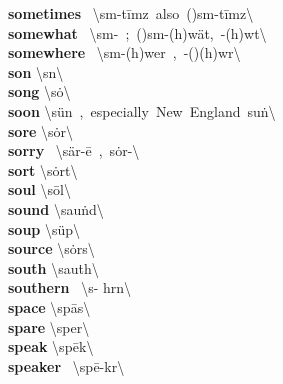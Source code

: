 \documentclass[10pt,a4paper]{article}
\begin{document}
\begin{multicols}{2}
\textbf{ sometimes }\quad \ \textbackslash \textprimstress s\textschwa m-\textsecstress t\={i}mz\ also\ (\textsecstress )s\textschwa m-\textprimstress t\={i}mz\textbackslash \\
\textbf{ somewhat }\quad \ \textbackslash \textprimstress s\textschwa m-\textsecstress \ ;\ (\textsecstress )s\textschwa m-\textprimstress (h)w\"{a}t,\ -\textprimstress (h)w\textschwa t\textbackslash \\
\textbf{ somewhere }\quad \ \textbackslash \textprimstress s\textschwa m-\textsecstress (h)wer\ ,\ -(\textsecstress )(h)w\textschwa r\textbackslash \\
\textbf{ son }\quad \textbackslash \textprimstress s\textschwa n\textbackslash \\
\textbf{ song }\quad \textbackslash \textprimstress s\.{o}\engma \textbackslash \\
\textbf{ soon }\quad \textbackslash \textprimstress s\"{u}n\ ,\ especially\ New\ England\ \textprimstress su\. n\textbackslash \\
\textbf{ sore }\quad \textbackslash \textprimstress s\.{o}r\textbackslash \\
\textbf{ sorry }\quad \ \textbackslash \textprimstress s\"{a}r-\={e}\ ,\ \textprimstress s\.{o}r-\textbackslash \\
\textbf{ sort }\quad \textbackslash \textprimstress s\.{o}rt\textbackslash \\
\textbf{ soul }\quad \textbackslash \textprimstress s\={o}l\textbackslash \\
\textbf{ sound }\quad \textbackslash \textprimstress sau\. nd\textbackslash \\
\textbf{ soup }\quad \textbackslash \textprimstress s\"{u}p\textbackslash \\
\textbf{ source }\quad \textbackslash \textprimstress s\.{o}rs\textbackslash \\
\textbf{ south }\quad \textbackslash \textprimstress sau\. th\textbackslash \\
\textbf{ southern }\quad \ \textbackslash \textprimstress s\textschwa - h\textschwa rn\textbackslash \\
\textbf{ space }\quad \textbackslash \textprimstress sp\={a}s\textbackslash \\
\textbf{ spare }\quad \textbackslash \textprimstress sper\textbackslash \\
\textbf{ speak }\quad \textbackslash \textprimstress sp\={e}k\textbackslash \\
\textbf{ speaker }\quad \ \textbackslash \textprimstress sp\={e}-k\textschwa r\textbackslash \\

\end{multicols}
\end{document}
